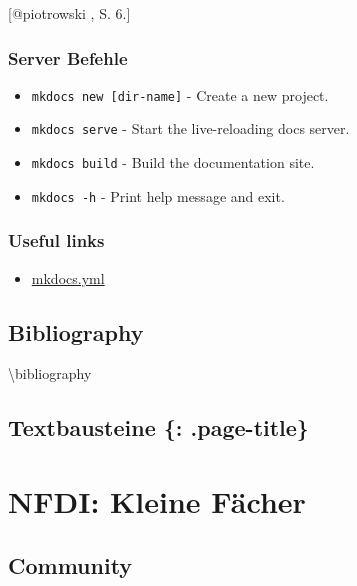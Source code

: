 {[}@piotrowski , S. 6.{]}

\hypertarget{server-befehle}{%
\subsubsection{Server Befehle}\label{server-befehle}}

\begin{itemize}
\tightlist
\item
  \texttt{mkdocs\ new\ {[}dir-name{]}} - Create a new project.
\item
  \texttt{mkdocs\ serve} - Start the live-reloading docs server.
\item
  \texttt{mkdocs\ build} - Build the documentation site.
\item
  \texttt{mkdocs\ -h} - Print help message and exit.
\end{itemize}

\hypertarget{useful-links}{%
\subsubsection{Useful links}\label{useful-links}}

\begin{itemize}
\tightlist
\item
  \href{https://github.com/squidfunk/mkdocs-material/issues/748}{mkdocs.yml}
\end{itemize}

\hypertarget{bibliography}{%
\subsection{Bibliography}\label{bibliography}}

\textbackslash bibliography

\hypertarget{textbausteine-.page-title}{%
\subsection{Textbausteine \{:
.page-title\}}\label{textbausteine-.page-title}}

\hypertarget{nfdi-kleine-fuxe4cher}{%
\section{NFDI: Kleine Fächer}\label{nfdi-kleine-fuxe4cher}}

\hypertarget{community}{%
\subsection{Community}\label{community}}

